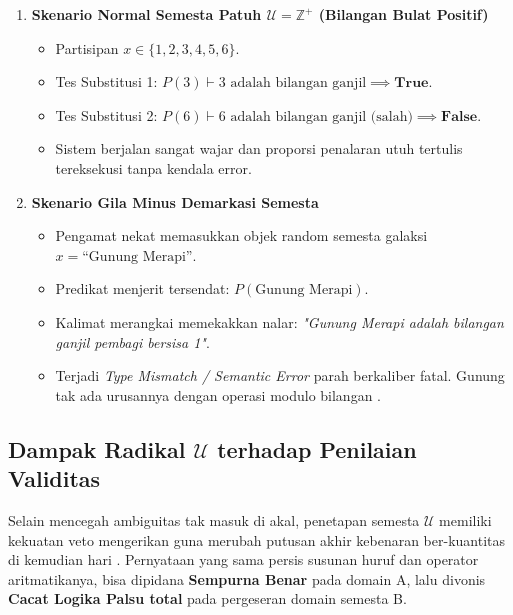 \begin{enumerate}
    \item \textbf{Skenario Normal Semesta Patuh $\mathcal{U} = \mathbb{Z}^+$ (Bilangan Bulat Positif)}
    \begin{itemize}
        \item Partisipan $x \in \{1, 2, 3, 4, 5, 6\}$.
        \item Tes Substitusi 1: $P(3) \vdash 3 \text{ adalah bilangan ganjil} \implies \textbf{True}$.
        \item Tes Substitusi 2: $P(6) \vdash 6 \text{ adalah bilangan ganjil (salah)} \implies \textbf{False}$.
        \item Sistem berjalan sangat wajar dan proporsi penalaran utuh tertulis tereksekusi tanpa kendala error.
    \end{itemize}

    \item \textbf{Skenario Gila Minus Demarkasi Semesta}
    \begin{itemize}
        \item Pengamat nekat memasukkan objek random semesta galaksi $x = \text{``Gunung Merapi''}$.
        \item Predikat menjerit tersendat: $P(\text{Gunung Merapi})$.
        \item Kalimat merangkai memekakkan nalar: \textit{"Gunung Merapi adalah bilangan ganjil pembagi bersisa 1"}.
        \item Terjadi \textit{Type Mismatch / Semantic Error} parah berkaliber fatal. Gunung tak ada urusannya dengan operasi modulo bilangan \cite{wiki_domain_of_discourse}.
    \end{itemize}
\end{enumerate}

\subsection{Dampak Radikal $\mathcal{U}$ terhadap Penilaian Validitas}

Selain mencegah ambiguitas tak masuk di akal, penetapan semesta $\mathcal{U}$ memiliki kekuatan veto mengerikan guna merubah putusan akhir kebenaran ber-kuantitas di kemudian hari \cite{wiki_first_order_logic}. Pernyataan yang sama persis susunan huruf dan operator aritmatikanya, bisa dipidana \textbf{Sempurna Benar} pada domain A, lalu divonis \textbf{Cacat Logika Palsu total} pada pergeseran domain semesta B.

